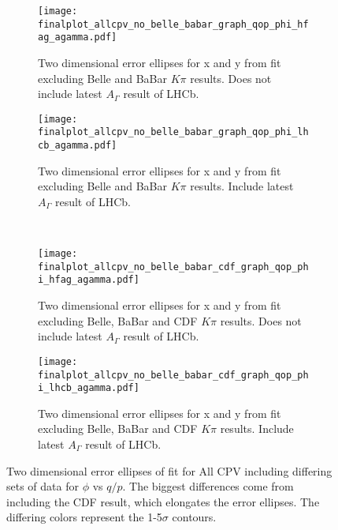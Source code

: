 \begin{figure}[tb]
  \begin{center}
    \begin{subfigure}[b]{0.4\textwidth}
      \centering
      \texttt{[image: finalplot\_allcpv\_no\_belle\_babar\_graph\_qop\_phi\_hfag\_agamma.pdf]}
      \caption{Two dimensional error ellipses for x and y from fit excluding Belle and BaBar $K\pi$ results. Does not include latest $A_\Gamma$ result of LHCb.}
      \label{fig:xy_all_cpv_no_agamma}
    \end{subfigure}%
    \hspace{2mm}
    \begin{subfigure}[b]{0.4\textwidth}
      \centering
      \texttt{[image: finalplot\_allcpv\_no\_belle\_babar\_graph\_qop\_phi\_lhcb\_agamma.pdf]}
      \caption{Two dimensional error ellipses for x and y from fit excluding Belle and BaBar $K\pi$ results. Include latest $A_\Gamma$ result of LHCb.}
      \label{fig:xy_all_cpv_with_agamma}
    \end{subfigure}%
        \\
    \begin{subfigure}[b]{0.4\textwidth}
      \centering
      \texttt{[image: finalplot\_allcpv\_no\_belle\_babar\_cdf\_graph\_qop\_phi\_hfag\_agamma.pdf]}
      \caption{Two dimensional error ellipses for x and y from fit excluding Belle, BaBar and CDF $K\pi$ results. Does not include latest $A_\Gamma$ result of LHCb.}
      \label{fig:xy_all_cpv_no_agamma}
    \end{subfigure}%
    \hspace{2mm}
    \begin{subfigure}[b]{0.4\textwidth}
      \centering
      \texttt{[image: finalplot\_allcpv\_no\_belle\_babar\_cdf\_graph\_qop\_phi\_lhcb\_agamma.pdf]}
      \caption{Two dimensional error ellipses for x and y from fit excluding Belle, BaBar and CDF $K\pi$ results. Include latest $A_\Gamma$ result of LHCb.}
      \label{fig:xy_all_cpv_with_agamma}
    \end{subfigure}%
  \end{center}
  \caption{Two dimensional error ellipses of fit for All CPV including differing sets of data for $\phi$ vs $q/p$. The biggest differences come from including the CDF result, which elongates the error ellipses. The differing colors represent the 1-5$\sigma$ contours.}
  \label{fig:xy_all_variations}
\end{figure}
